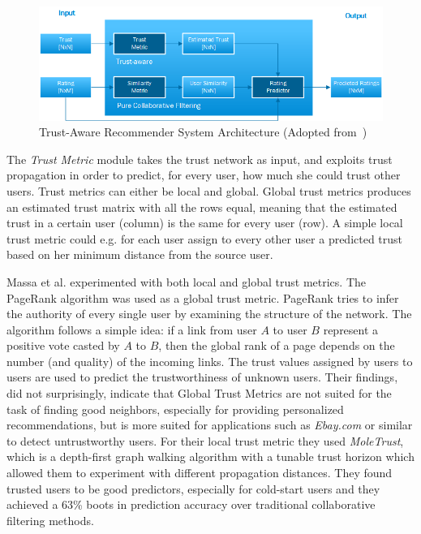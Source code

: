\begin{figure}[H]
    \includegraphics[width=5in]{image/trustawarearchitecture.png}
    \centering
    \caption[Trust-Aware Recommender System Architecture]{Trust-Aware
    Recommender System Architecture (Adopted from~\cite{Massa2004})}
    \label{figure:trustarchictecture}
\end{figure}

The \emph{Trust Metric} module takes the trust network as input, and exploits
trust propagation in order to predict, for every user, how much she could trust
other users. Trust metrics can either be local and global. Global trust metrics
produces an estimated trust matrix with all the rows equal, meaning that the
estimated trust in a certain user (column) is the same for every user (row). A
simple local trust metric could e.g. for each user assign to every other user a
predicted trust based on her minimum distance from the source user.

Massa et al. \cite{Massa2007} experimented with both local and global trust
metrics. The PageRank algorithm was used as a global trust metric. PageRank
tries to infer the authority of every single user by examining the structure of
the network. The algorithm follows a simple idea: if a link from user $A$ to
user $B$ represent a positive vote casted by $A$ to $B$, then the global rank
of a page depends on the number (and quality) of the incoming links. The trust
values assigned by users to users are used to predict the trustworthiness of
unknown users. Their findings, did not surprisingly, indicate that Global Trust
Metrics are not suited for the task of finding good neighbors, especially for
providing personalized recommendations, but is more suited for applications such
as \emph{Ebay.com} or similar to detect untrustworthy users. For their local trust metric
they used \emph{MoleTrust}, which is a depth-first graph walking algorithm with a tunable
trust horizon which allowed them to experiment with different propagation
distances. They found trusted users to be good predictors, especially for cold-start
users and they achieved a 63\% boots in prediction accuracy over traditional collaborative filtering
methods.

